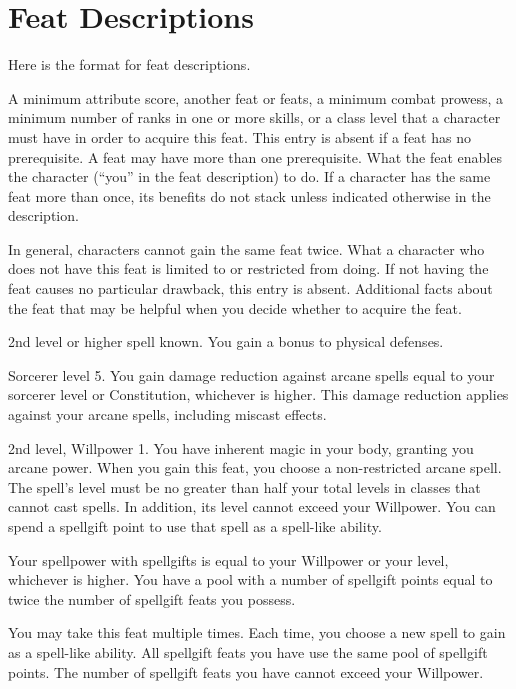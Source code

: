 \twocolumn

\section{Feat Descriptions}
Here is the format for feat descriptions.

\featpre A minimum attribute score, another feat or feats, a minimum combat prowess, a minimum number of ranks in one or more skills, or a class level that a character must have in order to acquire this feat.
This entry is absent if a feat has no prerequisite.
A feat may have more than one prerequisite.
\featben What the feat enables the character (``you'' in the feat description) to do.
If a character has the same feat more than once, its benefits do not stack unless indicated otherwise in the description.
\par In general, characters cannot gain the same feat twice.
What a character who does not have this feat is limited to or restricted from doing.
If not having the feat causes no particular drawback, this entry is absent.
Additional facts about the feat that may be helpful when you decide whether to acquire the feat.

\featpre 2nd level or higher  spell known.
\featben You gain a  bonus to physical defenses.

\featpre Sorcerer level 5.
\featben You gain damage reduction against arcane spells equal to your sorcerer level or Constitution, whichever is higher.
This damage reduction applies against your arcane spells, including miscast effects.

\featpres 2nd level, Willpower 1.
\featben You have inherent magic in your body, granting you arcane power.
When you gain this feat, you choose a non-restricted arcane spell.
The spell's level must be no greater than half your total levels in classes that cannot cast spells.
In addition, its level cannot exceed your Willpower.
You can spend a spellgift point to use that spell as a spell-like ability.

Your spellpower with spellgifts is equal to your Willpower or your level, whichever is higher.
You have a pool with a number of spellgift points equal to twice the number of spellgift feats you possess.

You may take this feat multiple times.
Each time, you choose a new spell to gain as a spell-like ability.
All spellgift feats you have use the same pool of spellgift points.
The number of spellgift feats you have cannot exceed your Willpower.

